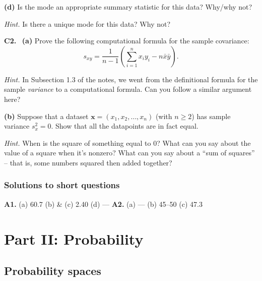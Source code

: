 \documentclass[
  a4paper,
]{book}
\theoremstyle{definition}
\theoremstyle{definition}
\theoremstyle{definition}
\theoremstyle{definition}
\theoremstyle{remark}
\begin{document}
\textbf{(d)} Is the mode an appropriate summary statistic for this data? Why/why not?

\begin{myanswers}
\emph{Hint.}
Is there a unique mode for this data? Why not?

\end{myanswers}

\textbf{C2.}
~\textbf{(a)} Prove the following computational formula for the sample covariance:
\[ s_{xy} = \frac{1}{n-1} \left( \sum_{i=1}^n x_iy_i - n\bar x \bar y \right). \]

\begin{myanswers}
\emph{Hint.}
In Subsection 1.3 of the notes, we went from the definitional formula for the sample \emph{variance} to a computational formula. Can you follow a similar argument here?

\end{myanswers}

\textbf{(b)} Suppose that a dataset \(\mathbf x = (x_1, x_2, \dots, x_n)\) (with \(n \geq 2\)) has sample variance \(s_x^2 = 0\). Show that all the datapoints are in fact equal.

\begin{myanswers}
\emph{Hint.}
When is the square of something equal to 0? What can you say about the value of a square when it's nonzero? What can you say about a ``sum of squares'' -- that is, some numbers squared then added together?

\end{myanswers}

\hypertarget{P1-short-sols}{%
\section*{Solutions to short questions}\label{P1-short-sols}}

\textbf{A1.} (a) 60.7 (b) \& (c) 2.40 (d) --- \textbf{A2.} (a) --- (b) 45--50 (c) 47.3

\hypertarget{part-part-ii-probability}{%
\part*{Part II: Probability}\label{part-part-ii-probability}}

\hypertarget{S02-probability}{%
\chapter{Probability spaces}\label{S02-probability}}
\end{document}
